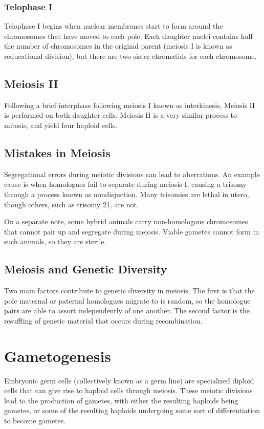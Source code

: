 \documentclass[12pt,titlepage]{article}
\begin{document}
        \subsubsection{Telophase I}
          Telophase I begins when nuclear membranes start to form around the chromosomes that have moved to each pole. Each daughter nuclei contains half the number of chromosomes
          in the original parent (meiosis I is known as reducational division), but there are two sister chromatids for each chromosome.

      \subsection{Meiosis II}
        Following a brief interphase following meiosis I known as interkinesis, Meiosis II is performed on both daughter cells. Meiosis II is a very similar process to mitosis,
        and yield four haploid cells.

      \subsection{Mistakes in Meiosis}
        Segregational errors during meiotic divisions can lead to aberrations. An example cause is when homologues fail to separate during meiosis I, causing a trisomy through
        a process known as nondisjuction. Many trisomies are lethal in utero, though others, such as trisomy 21, are not.

        On a separate note, some hybrid animals carry non-homologous chromosomes that cannot pair up and segregate during meiosis. Viable gametes cannot form in such animals,
        so they are sterile.

      \subsection{Meiosis and Genetic Diversity}
        Two main factors contribute to genetic diversity in meiosis. The first is that the pole maternal or paternal homologues migrate to is random, so the homologue pairs
        are able to assort independently of one another. The second factor is the resuffling of genetic material that occurs during recombination.

    \section{Gametogenesis}
      Embryonic germ cells (collectively known as a germ line) are specialized diploid cells that can give rise to haploid cells through meiosis. These meiotic divisions lead
      to the production of gametes, with either the resulting haploids being gametes, or some of the resulting haploids undergoing some sort of differentiation to become
      gametes.
\end{document}
